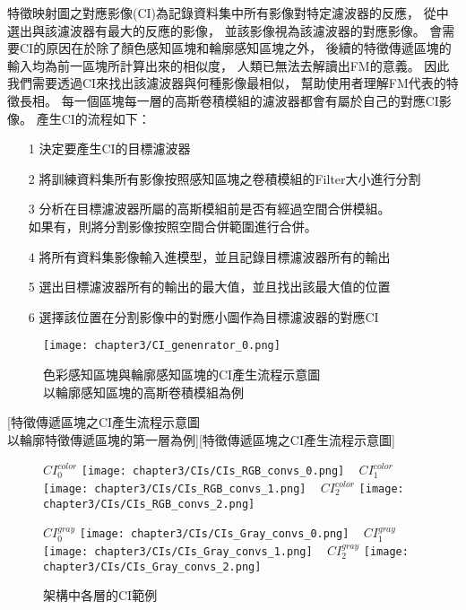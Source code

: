 \documentclass[class=NCU_thesis, crop=false]{standalone}
\begin{document}
	特徵映射圖之對應影像(CI)為記錄資料集中所有影像對特定濾波器的反應，
	從中選出與該濾波器有最大的反應的影像，
	並該影像視為該濾波器的對應影像。
	會需要CI的原因在於除了顏色感知區塊和輪廓感知區塊之外，
	後續的特徵傳遞區塊的輸入均為前一區塊所計算出來的相似度，
	人類已無法去解讀出FM的意義。
	因此我們需要透過CI來找出該濾波器與何種影像最相似，
	幫助使用者理解FM代表的特徵長相。
	每一個區塊每一層的高斯卷積模組的濾波器都會有屬於自己的對應CI影像。
	產生CI的流程如下：
	\begin{itemize}
		\item [1]
		決定要產生CI的目標濾波器
		\item [2]
		將訓練資料集所有影像按照感知區塊之卷積模組的Filter大小進行分割
		\item [3]
		分析在目標濾波器所屬的高斯模組前是否有經過空間合併模組。\\
		如果有，則將分割影像按照空間合併範圍進行合併。
		\item [4]
		將所有資料集影像輸入進模型，並且記錄目標濾波器所有的輸出
		\item [5]
		選出目標濾波器所有的輸出的最大值，並且找出該最大值的位置
		\item [6]
		選擇該位置在分割影像中的對應小圖作為目標濾波器的對應CI
	\end{itemize}


	\begin{figure}[H]
	\centering
	\label{fig:CI_generator_0}
	\captionsetup{justification=centering}
	\caption{色彩感知區塊與輪廓感知區塊的CI產生流程示意圖 \\ 以輪廓感知區塊的高斯卷積模組為例}
	\texttt{[image: chapter3/CI\_genenrator\_0.png]}
	\end{figure}

	[特徵傳遞區塊之CI產生流程示意圖 \\
	以輪廓特徵傳遞區塊的第一層為例][特徵傳遞區塊之CI產生流程示意圖]

	\begin{figure}[H]
    \centering
    \subcaptionbox
        {$CI^{color}_0$
        \label{fig:CI_color_0}}
        {\texttt{[image: chapter3/CIs/CIs\_RGB\_convs\_0.png]}}
    ~
    \subcaptionbox
        {$CI^{color}_1$
        \label{fig:CI_color_1}}
        {\texttt{[image: chapter3/CIs/CIs\_RGB\_convs\_1.png]}}
    ~
    \subcaptionbox
        {$CI^{color}_2$
        \label{fig:CI_color_2}}
        {\texttt{[image: chapter3/CIs/CIs\_RGB\_convs\_2.png]}}

     \subcaptionbox
        {$CI^{gray}_0$
        \label{fig:CI_gray_0}}
        {\texttt{[image: chapter3/CIs/CIs\_Gray\_convs\_0.png]}}
    ~
    \subcaptionbox
        {$CI^{gray}_1$
        \label{fig:CI_gray_1}}
        {\texttt{[image: chapter3/CIs/CIs\_Gray\_convs\_1.png]}}
    ~
    \subcaptionbox
        {$CI^{gray}_2$
        \label{fig:CI_gray_2}}
        {\texttt{[image: chapter3/CIs/CIs\_Gray\_convs\_2.png]}}
    \caption{架構中各層的CI範例}
    \label{fig:CIs}
	\end{figure}
\end{document}
